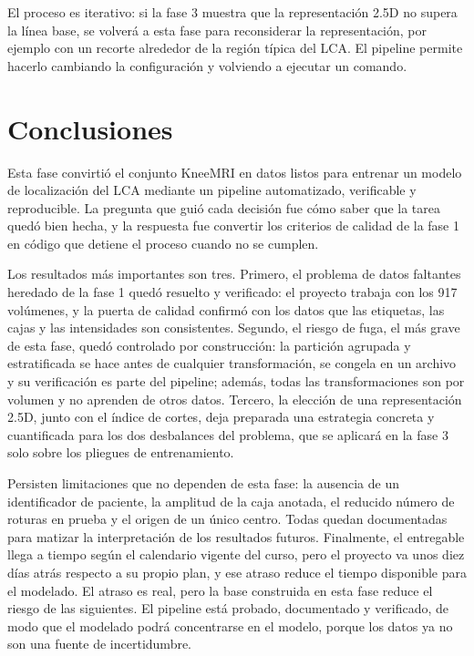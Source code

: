 \documentclass[12pt,letterpaper]{article}
\begin{document}
\noindent El proceso es iterativo: si la fase 3 muestra que la representación 2.5D no supera la línea base, se volverá a esta fase para reconsiderar la representación, por ejemplo con un recorte alrededor de la región típica del LCA. El pipeline permite hacerlo cambiando la configuración y volviendo a ejecutar un comando.

\section{Conclusiones}\label{sec:conclusiones}

Esta fase convirtió el conjunto KneeMRI en datos listos para entrenar un modelo de localización del LCA mediante un pipeline automatizado, verificable y reproducible. La pregunta que guió cada decisión fue cómo saber que la tarea quedó bien hecha, y la respuesta fue convertir los criterios de calidad de la fase 1 en código que detiene el proceso cuando no se cumplen.

Los resultados más importantes son tres. Primero, el problema de datos faltantes heredado de la fase 1 quedó resuelto y verificado: el proyecto trabaja con los 917 volúmenes, y la puerta de calidad confirmó con los datos que las etiquetas, las cajas y las intensidades son consistentes. Segundo, el riesgo de fuga, el más grave de esta fase, quedó controlado por construcción: la partición agrupada y estratificada se hace antes de cualquier transformación, se congela en un archivo y su verificación es parte del pipeline; además, todas las transformaciones son por volumen y no aprenden de otros datos. Tercero, la elección de una representación 2.5D, junto con el índice de cortes, deja preparada una estrategia concreta y cuantificada para los dos desbalances del problema, que se aplicará en la fase 3 solo sobre los pliegues de entrenamiento.

Persisten limitaciones que no dependen de esta fase: la ausencia de un identificador de paciente, la amplitud de la caja anotada, el reducido número de roturas en prueba y el origen de un único centro. Todas quedan documentadas para matizar la interpretación de los resultados futuros. Finalmente, el entregable llega a tiempo según el calendario vigente del curso, pero el proyecto va unos diez días atrás respecto a su propio plan, y ese atraso reduce el tiempo disponible para el modelado. El atraso es real, pero la base construida en esta fase reduce el riesgo de las siguientes. El pipeline está probado, documentado y verificado, de modo que el modelado podrá concentrarse en el modelo, porque los datos ya no son una fuente de incertidumbre.

\clearpage


\end{document}

